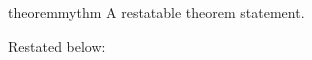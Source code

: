 \documentclass{article}
\begin{document}
\begin{restatable}{theorem}{mythm}
A restatable theorem statement.
\end{restatable}
Restated below: \mythm*
\end{document}
